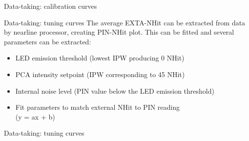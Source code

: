 \documentclass[xcolor=table]{beamer}
\begin{document}
\begin{frame}{Data-taking: calibration curves}
\noindent{}
\end{frame}

\begin{frame}{Data-taking: tuning curves}
The average EXTA-NHit can be extracted from data by nearline processor, creating PIN-NHit plot. This can be fitted and several parameters can be extracted:
\begin{itemize}
	\item LED emission threshold (lowest IPW producing 0 NHit)
	\item PCA intensity setpoint (IPW corresponding to 45 NHit)
	\item Internal noise level (PIN value below the LED emission threshold)
	\item Fit parameters to match external NHit to PIN reading \\ (y = ax + b)
\end{itemize}
\end{frame}

\begin{frame}{Data-taking: tuning curves}
\noindent{}
\end{frame}
\end{document}
